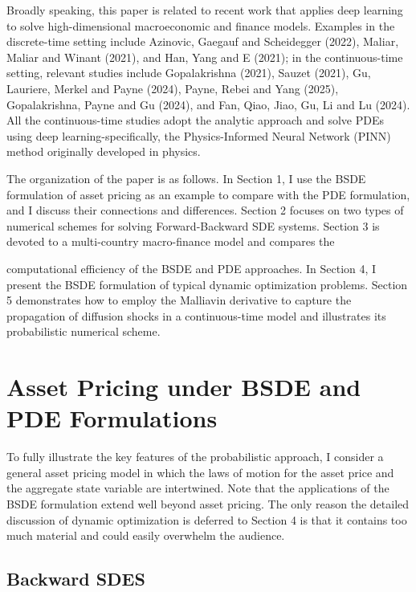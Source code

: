 \documentclass{article}
\begin{document}
Broadly speaking, this paper is related to recent work that applies deep learning to solve high-dimensional macroeconomic and finance models. Examples in the discrete-time setting include Azinovic, Gaegauf and Scheidegger (2022), Maliar, Maliar and Winant (2021), and Han, Yang and E (2021); in the continuous-time setting, relevant studies include Gopalakrishna (2021), Sauzet (2021), Gu, Lauriere, Merkel and Payne (2024), Payne, Rebei and Yang (2025), Gopalakrishna, Payne and Gu (2024), and Fan, Qiao, Jiao, Gu, Li and Lu (2024). All the continuous-time studies adopt the analytic approach and solve PDEs using deep learning-specifically, the Physics-Informed Neural Network (PINN) method originally developed in physics.

The organization of the paper is as follows. In Section 1, I use the BSDE formulation of asset pricing as an example to compare with the PDE formulation, and I discuss their connections and differences. Section 2 focuses on two types of numerical schemes for solving Forward-Backward SDE systems. Section 3 is devoted to a multi-country macro-finance model and compares the

\clearpage

computational efficiency of the BSDE and PDE approaches. In Section 4, I present the BSDE formulation of typical dynamic optimization problems. Section 5 demonstrates how to employ the Malliavin derivative to capture the propagation of diffusion shocks in a continuous-time model and illustrates its probabilistic numerical scheme.

\section{Asset Pricing under BSDE and PDE Formulations}

To fully illustrate the key features of the probabilistic approach, I consider a general asset pricing model in which the laws of motion for the asset price and the aggregate state variable are intertwined. Note that the applications of the BSDE formulation extend well beyond asset pricing. The only reason the detailed discussion of dynamic optimization is deferred to Section 4 is that it contains too much material and could easily overwhelm the audience.

\subsection{Backward SDES}
\end{document}
